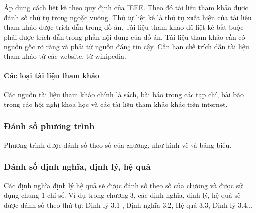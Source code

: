 Áp dụng cách liệt kê theo quy định của IEEE. Theo đó tài liệu tham khảo được đánh số thứ tự trong ngoặc vuông. Thứ tự liệt kê là thứ tự xuất hiện của tài liệu tham khảo được trích dẫn trong đồ án. Tài liệu tham khảo đã liệt kê bắt buộc phải được trích dẫn trong phần nội dung của đồ án. Tài liệu tham khảo cần có nguồn gốc rõ ràng và phải từ nguồn đáng tin cậy. Cần hạn chế trích dẫn tài liệu tham khảo từ các website, từ wikipedia.
\paragraph{Các loại tài liệu tham khảo} \mbox{} %

Các nguồn tài liệu tham khảo chính là sách, bài báo trong các tạp chí, bài báo trong các hội nghị khoa học và các tài liệu tham khảo khác trên internet.
\subsubsection{Đánh số phương trình}
Phương trình được đánh số theo số của chương, như hình vẽ và bảng biểu.
\subsubsection{Đánh số định nghĩa, định lý, hệ quả}
Các định nghĩa định lý hệ quả sẽ được đánh số theo số của chương và được sử dụng chung 1 chỉ số. Ví dụ trong chương 3, các định nghĩa, định lý, hệ quả sẽ được đánh số theo thứ tự: Định lý 3.1 , Định nghĩa 3.2, Hệ quả 3.3, Định lý 3.4...

\cleardoublepage